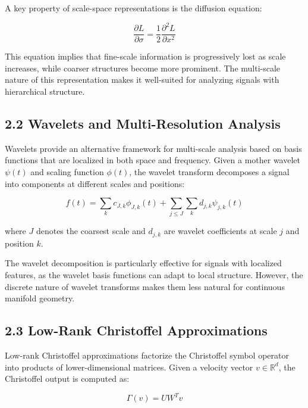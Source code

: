 \documentclass[12pt]{article}
\begin{document}
A key property of scale-space representations is the diffusion equation:

\begin{equation}
\frac{\partial L}{\partial \sigma} = \frac{1}{2} \frac{\partial^2 L}{\partial x^2}
\end{equation}

This equation implies that fine-scale information is progressively lost as scale increases, while coarser structures become more prominent. The multi-scale nature of this representation makes it well-suited for analyzing signals with hierarchical structure.

\subsection{2.2 Wavelets and Multi-Resolution Analysis}

Wavelets provide an alternative framework for multi-scale analysis based on basis functions that are localized in both space and frequency. Given a mother wavelet $\psi(t)$ and scaling function $\phi(t)$, the wavelet transform decomposes a signal into components at different scales and positions:

\begin{equation}
f(t) = \sum_{k} c_{J,k} \phi_{J,k}(t) + \sum_{j \leq J} \sum_{k} d_{j,k} \psi_{j,k}(t)
\end{equation}

where $J$ denotes the coarsest scale and $d_{j,k}$ are wavelet coefficients at scale $j$ and position $k$.

The wavelet decomposition is particularly effective for signals with localized features, as the wavelet basis functions can adapt to local structure. However, the discrete nature of wavelet transforms makes them less natural for continuous manifold geometry.

\subsection{2.3 Low-Rank Christoffel Approximations}

Low-rank Christoffel approximations factorize the Christoffel symbol operator into products of lower-dimensional matrices. Given a velocity vector $v \in \mathbb{R}^d$, the Christoffel output is computed as:

\begin{equation}
\Gamma(v) = U W^T v
\end{equation}
\end{document}
